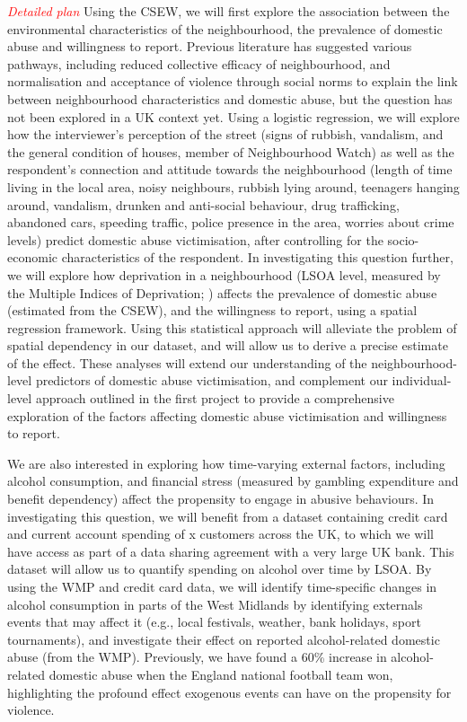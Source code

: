 \documentclass[11pt, a4paper]{article}
\begin{document}
\textcolor{red}{\textit{Detailed plan}} Using the CSEW, we will first explore the association between the environmental characteristics of the neighbourhood, the prevalence of domestic abuse and willingness to report. Previous literature has suggested various pathways, including reduced collective efficacy of neighbourhood, and normalisation and acceptance of violence through social norms to explain the link between neighbourhood characteristics and domestic abuse, but the question has not been explored in a UK context yet. Using a logistic regression, we will explore how the interviewer's perception of the street (signs of rubbish, vandalism, and the general condition of houses, member of Neighbourhood Watch) as well as the respondent's connection and attitude towards the neighbourhood (length of time living in the local area, noisy neighbours, rubbish lying around, teenagers hanging around, vandalism, drunken and anti-social behaviour, drug trafficking, abandoned cars, speeding traffic, police presence in the area, worries about crime levels) predict domestic abuse victimisation, after controlling for the socio-economic characteristics of the respondent. In investigating this question further, we will explore how deprivation in a neighbourhood (LSOA level, measured by the Multiple Indices of Deprivation; ) affects the prevalence of domestic abuse (estimated from the CSEW), and the willingness to report, using a spatial regression framework. Using this statistical approach will alleviate the problem of spatial dependency in our dataset, and will allow us to derive a precise estimate of the effect. These analyses will extend our understanding of the neighbourhood-level predictors of domestic abuse victimisation, and complement our individual-level approach outlined in the first project to provide a comprehensive exploration of the factors affecting domestic abuse victimisation and willingness to report. 
 


We are also interested in exploring how time-varying external factors, including alcohol consumption, and financial stress (measured by gambling expenditure and benefit dependency) affect the propensity to engage in abusive behaviours. In investigating this question, we will benefit from a dataset containing credit card and current account spending of x customers across the UK, to which we will have access as part of a data sharing agreement with a very large UK bank. This dataset will allow us to quantify spending on alcohol over time by LSOA. By using the WMP and credit card data, we will identify time-specific changes in alcohol consumption in parts of the West Midlands by identifying externals events that may affect it (e.g., local festivals, weather, bank holidays, sport tournaments), and investigate their effect on reported alcohol-related domestic abuse (from the WMP). Previously, we have found a 60\% increase in alcohol-related domestic abuse when the England national football team won, highlighting the profound effect exogenous events can have on the propensity for violence. 
\end{document}
